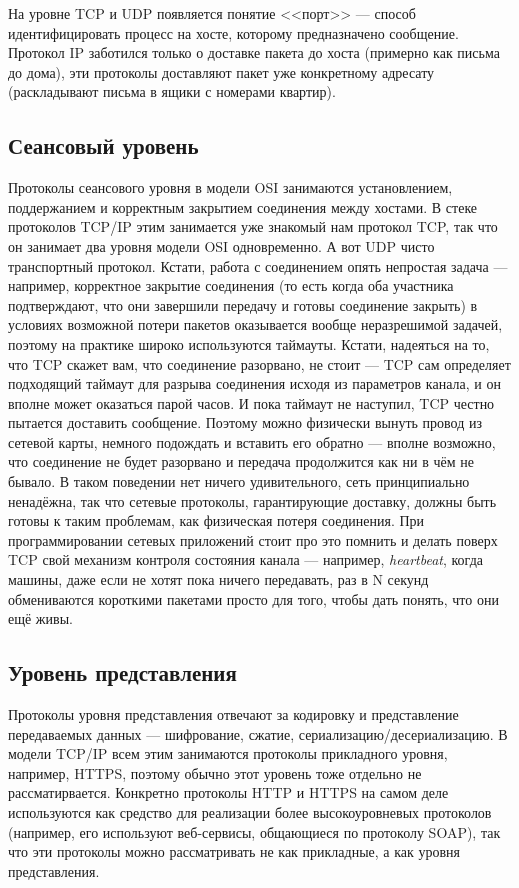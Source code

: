 \documentclass[a5paper]{article}
\begin{document}
На уровне TCP и UDP появляется понятие <<порт>> --- способ идентифицировать процесс на хосте, которому предназначено сообщение. Протокол IP заботился только о доставке пакета до хоста (примерно как письма до дома), эти протоколы доставляют пакет уже конкретному адресату (раскладывают письма в ящики с номерами квартир).

\subsection{Сеансовый уровень}

Протоколы сеансового уровня в модели OSI занимаются установлением, поддержанием и корректным закрытием соединения между хостами. В стеке протоколов TCP/IP этим занимается уже знакомый нам протокол TCP, так что он занимает два уровня модели OSI одновременно. А вот UDP чисто транспортный протокол. Кстати, работа с соединением опять непростая задача --- например, корректное закрытие соединения (то есть когда оба участника подтверждают, что они завершили передачу и готовы соединение закрыть) в условиях возможной потери пакетов оказывается вообще неразрешимой задачей, поэтому на практике широко используются таймауты. Кстати, надеяться на то, что TCP скажет вам, что соединение разорвано, не стоит --- TCP сам определяет подходящий таймаут для разрыва соединения исходя из параметров канала, и он вполне может оказаться парой часов. И пока таймаут не наступил, TCP честно пытается доставить сообщение. Поэтому можно физически вынуть провод из сетевой карты, немного подождать и вставить его обратно --- вполне возможно, что соединение не будет разорвано и передача продолжится как ни в чём не бывало. В таком поведении нет ничего удивительного, сеть принципиально ненадёжна, так что сетевые протоколы, гарантирующие доставку, должны быть готовы к таким проблемам, как физическая потеря соединения. При программировании сетевых приложений стоит про это помнить и делать поверх TCP свой механизм контроля состояния канала --- например, \textit{heartbeat}, когда машины, даже если не хотят пока ничего передавать, раз в N секунд обмениваются короткими пакетами просто для того, чтобы дать понять, что они ещё живы.

\subsection{Уровень представления}

Протоколы уровня представления отвечают за кодировку и представление передаваемых данных --- шифрование, сжатие, сериализацию/десериализацию. В модели TCP/IP всем этим занимаются протоколы прикладного уровня, например, HTTPS, поэтому обычно этот уровень тоже отдельно не рассматирвается. Конкретно протоколы HTTP и HTTPS на самом деле используются как средство для реализации более высокоуровневых протоколов (например, его используют веб-сервисы, общающиеся по протоколу SOAP), так что эти протоколы можно рассматривать не как прикладные, а как уровня представления.
\end{document}
